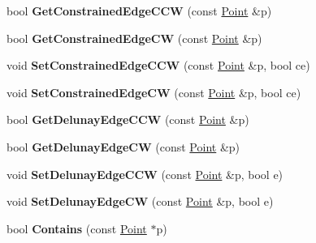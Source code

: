 \begin{DoxyCompactItemize}
\item 
\mbox{\label{classp2t_1_1Triangle_a828b2eea8bc4cd160fbee5188ad1c696}} 
bool {\bfseries Get\+Constrained\+Edge\+C\+CW} (const \hyperlink{structp2t_1_1Point}{Point} \&p)
\item 
\mbox{\label{classp2t_1_1Triangle_aa68564476215938a9c27efd3998f3edc}} 
bool {\bfseries Get\+Constrained\+Edge\+CW} (const \hyperlink{structp2t_1_1Point}{Point} \&p)
\item 
\mbox{\label{classp2t_1_1Triangle_a428d2e75df9f4c51a4b69b9fdc70f052}} 
void {\bfseries Set\+Constrained\+Edge\+C\+CW} (const \hyperlink{structp2t_1_1Point}{Point} \&p, bool ce)
\item 
\mbox{\label{classp2t_1_1Triangle_a3ad12459aeda58122935c69b0657db07}} 
void {\bfseries Set\+Constrained\+Edge\+CW} (const \hyperlink{structp2t_1_1Point}{Point} \&p, bool ce)
\item 
\mbox{\label{classp2t_1_1Triangle_ad5adaf18430c505ab62b7c75413135ed}} 
bool {\bfseries Get\+Delunay\+Edge\+C\+CW} (const \hyperlink{structp2t_1_1Point}{Point} \&p)
\item 
\mbox{\label{classp2t_1_1Triangle_ad09c511139fc9ec27fc0f6eeff38829f}} 
bool {\bfseries Get\+Delunay\+Edge\+CW} (const \hyperlink{structp2t_1_1Point}{Point} \&p)
\item 
\mbox{\label{classp2t_1_1Triangle_ad3b7f67e5a08e26bf974f5a2d06c15ce}} 
void {\bfseries Set\+Delunay\+Edge\+C\+CW} (const \hyperlink{structp2t_1_1Point}{Point} \&p, bool e)
\item 
\mbox{\label{classp2t_1_1Triangle_a5d9844fcc2d8ad3ce2643520f1f62aaf}} 
void {\bfseries Set\+Delunay\+Edge\+CW} (const \hyperlink{structp2t_1_1Point}{Point} \&p, bool e)
\item 
\mbox{\label{classp2t_1_1Triangle_a93282c9e5203a8b1293c17f854be597b}} 
bool {\bfseries Contains} (const \hyperlink{structp2t_1_1Point}{Point} $\ast$p)
\item 
\mbox{\label{classp2t_1_1Triangle_a6f591a1d0eeea1199f522f5613bab5a3}} 

\end{DoxyCompactItemize}
